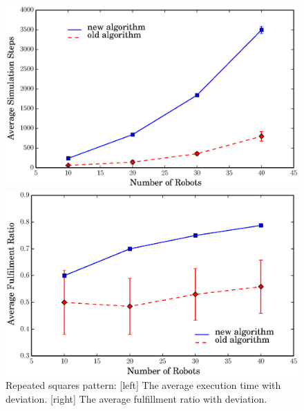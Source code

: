   
  \begin{figure}
    \centering    
    \begin{minipage}[b]{0.75\linewidth}
    \centering  
      \includegraphics[trim=0.5cm 0cm 1.5cm 0,clip=true,width=\linewidth]{figs/steps_square}
    \end{minipage}
    \begin{minipage}[b]{0.75\linewidth}
    \centering 
      \includegraphics[trim=0.5cm 0 1.5cm 0,clip=true,width=\linewidth]{figs/ratio_square}
    \end{minipage}
    \caption{Repeated squares pattern: [left] The average execution time with deviation. [right] The average fulfillment ratio with deviation.}
    \label{fig:sq_comp}
  \end{figure}
